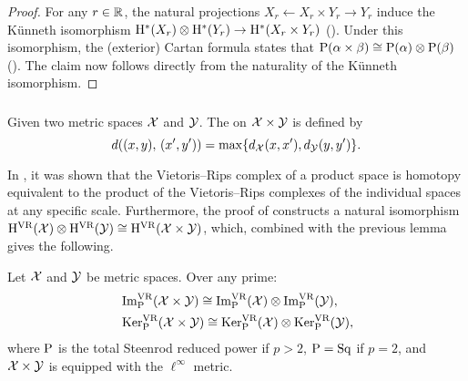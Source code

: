 \begin{proof}
	For any \(r \in \mathbb{R}\), the natural projections $X_r \leftarrow X_r \times Y_r \to Y_r$ induce the K\"unneth isomorphism $\mathrm{H}^*(X_r) \otimes \mathrm{H}^*(Y_r) \to \mathrm{H}^*(X_r \times Y_r)$ (\cite[Cor.~3B.7.]{hatcher2000}).
	Under this isomorphism, the (exterior) Cartan formula states that \(\mathrm{P}(\alpha \times \beta) \cong \mathrm{P}(\alpha) \otimes \mathrm{P}(\beta)\) (\cite[Cor.~2.7]{may1970general}).
	The claim now follows directly from the naturality of the K\"unneth isomorphism.
\end{proof}

\subsubsection{}\label{ss:products}

Given two metric spaces $\mathcal{X}$ and $\mathcal{Y}$.
The  on $\mathcal{X} \times \mathcal{Y}$ is defined by
\[
d((x,y), \, (x',y')) = \max\{d_{\mathcal{X}}(x,x'), d_{\mathcal{Y}}(y,y')\}.
\]

In \cite[Prop.~10.2]{adamaszek2017VietorisProduct}, it was shown that the Vietoris--Rips complex of a product space is homotopy equivalent to the product of the Vietoris--Rips complexes of the individual spaces at any specific scale.
Furthermore, the proof of \cite[Thm.~6.1(1)]{lim2024vietoris} constructs a natural isomorphism $\mathrm{H}^{\mathrm{VR}}(\mathcal{X}) \otimes \mathrm{H}^{\mathrm{VR}}(\mathcal{Y}) \cong \mathrm{H}^{\mathrm{VR}}(\mathcal{X} \times \mathcal{Y})$, which, combined with the previous lemma gives the following.

\theorem
Let $\mathcal{X}$ and $\mathcal{Y}$ be metric spaces.
Over any prime:
\begin{align*}
	&\operatorname{Im}^{\mathrm{VR}}_{\mathrm{P}}(\mathcal{X} \times \mathcal{Y}) \cong \operatorname{Im}^{\mathrm{VR}}_{\mathrm{P}}(\mathcal{X}) \otimes \operatorname{Im}^{\mathrm{VR}}_{\mathrm{P}}(\mathcal{Y}), \\
	&\operatorname{Ker}^{\mathrm{VR}}_{\mathrm{P}}(\mathcal{X} \times \mathcal{Y}) \cong \operatorname{Ker}^{\mathrm{VR}}_{\mathrm{P}}(\mathcal{X}) \otimes \operatorname{Ker}^{\mathrm{VR}}_{\mathrm{P}}(\mathcal{Y}),
\end{align*}
where \(\mathrm{P}\) is the total Steenrod reduced power if \(p > 2\),  \(\mathrm{P} = \mathrm{Sq}\) if \(p = 2\), and \(\mathcal{X} \times \mathcal{Y}\) is equipped with the \(\ell^\infty\) metric.


